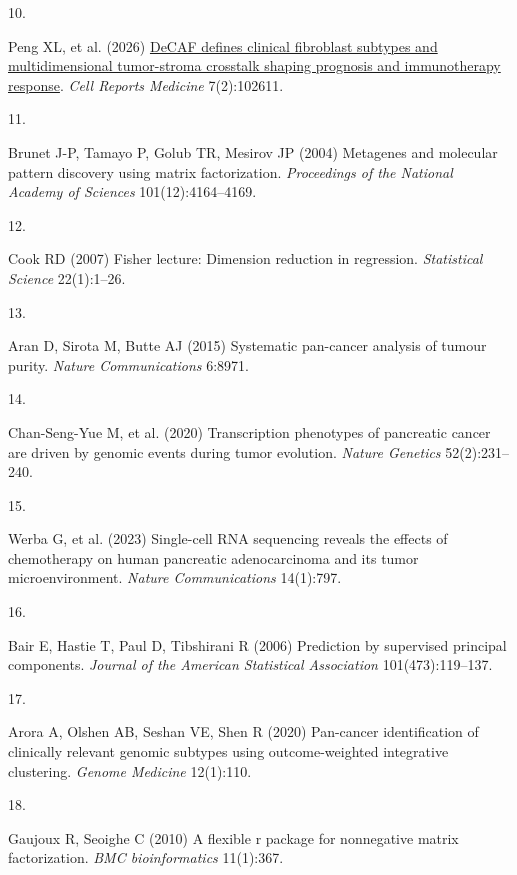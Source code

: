 \documentclass[9pt,twocolumn,twoside,]{pnas-new}
\newlength{\cslhangindent}
\newlength{\csllabelwidth}
\newenvironment{CSLReferences}[2] %
 {\begin{list}{}{%
  \setlength{\itemindent}{0pt}
  \setlength{\leftmargin}{0pt}
  \setlength{\parsep}{0pt}
  \ifodd #1
   \setlength{\leftmargin}{\cslhangindent}
   \setlength{\itemindent}{-1\cslhangindent}
  \fi
  \setlength{\itemsep}{#2\baselineskip}}}
 {\end{list}}
\newcommand{\CSLLeftMargin}[1]{\parbox[t]{\csllabelwidth}{#1}}
\newcommand{\CSLRightInline}[1]{\parbox[t]{\linewidth - \csllabelwidth}{#1}\break}
\begin{document}
\begin{CSLReferences}{0}{1}
\CSLLeftMargin{10. }%
\CSLRightInline{Peng XL, et al. (2026)
\href{https://doi.org/10.1016/j.xcrm.2026.102611}{DeCAF defines clinical
fibroblast subtypes and multidimensional tumor-stroma crosstalk shaping
prognosis and immunotherapy response}. \emph{Cell Reports Medicine}
7(2):102611.}

\CSLLeftMargin{11. }%
\CSLRightInline{Brunet J-P, Tamayo P, Golub TR, Mesirov JP (2004)
Metagenes and molecular pattern discovery using matrix factorization.
\emph{Proceedings of the National Academy of Sciences}
101(12):4164--4169.}

\CSLLeftMargin{12. }%
\CSLRightInline{Cook RD (2007) Fisher lecture: Dimension reduction in
regression. \emph{Statistical Science} 22(1):1--26.}

\CSLLeftMargin{13. }%
\CSLRightInline{Aran D, Sirota M, Butte AJ (2015) Systematic pan-cancer
analysis of tumour purity. \emph{Nature Communications} 6:8971.}

\CSLLeftMargin{14. }%
\CSLRightInline{Chan-Seng-Yue M, et al. (2020) Transcription phenotypes
of pancreatic cancer are driven by genomic events during tumor
evolution. \emph{Nature Genetics} 52(2):231--240.}

\CSLLeftMargin{15. }%
\CSLRightInline{Werba G, et al. (2023) Single-cell RNA sequencing
reveals the effects of chemotherapy on human pancreatic adenocarcinoma
and its tumor microenvironment. \emph{Nature Communications} 14(1):797.}

\CSLLeftMargin{16. }%
\CSLRightInline{Bair E, Hastie T, Paul D, Tibshirani R (2006) Prediction
by supervised principal components. \emph{Journal of the American
Statistical Association} 101(473):119--137.}

\CSLLeftMargin{17. }%
\CSLRightInline{Arora A, Olshen AB, Seshan VE, Shen R (2020) Pan-cancer
identification of clinically relevant genomic subtypes using
outcome-weighted integrative clustering. \emph{Genome Medicine}
12(1):110.}

\CSLLeftMargin{18. }%
\CSLRightInline{Gaujoux R, Seoighe C (2010) A flexible r package for
nonnegative matrix factorization. \emph{BMC bioinformatics} 11(1):367.}


\end{CSLReferences}
\end{document}
